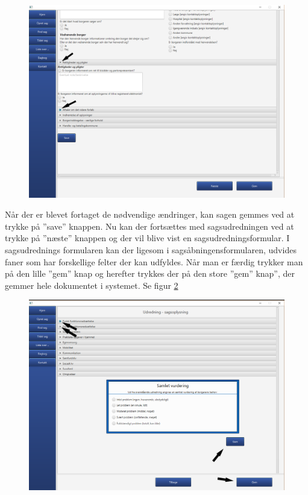 \begin{figure}[htb!]
  \includegraphics[scale = 0.3]{./PNG/brugervejledning/figur7.PNG} 
  \caption{}  
  \label{bru:f7}
\end{figure}\newpage
Når der er blevet fortaget de nødvendige ændringer, kan sagen gemmes ved at trykke på ”save” knappen. Nu kan der fortsættes med sagsudredningen ved at trykke på ”næste” knappen og der vil blive vist en sagsudredningsformular. I sagsudrednings formularen kan der ligesom i sagsåbningensformularen, udvides faner som har forskellige felter der kan udfyldes. Når man er færdig trykker man på den lille ”gem” knap og herefter trykkes der på den store ”gem” knap”, der gemmer hele dokumentet i systemet. Se figur \ref{bru:f8}
\begin{figure}[htb!]
  \includegraphics[scale = 0.3]{./PNG/brugervejledning/figur8.PNG} 
  \caption{}  
  \label{bru:f8}
\end{figure}\newpage
